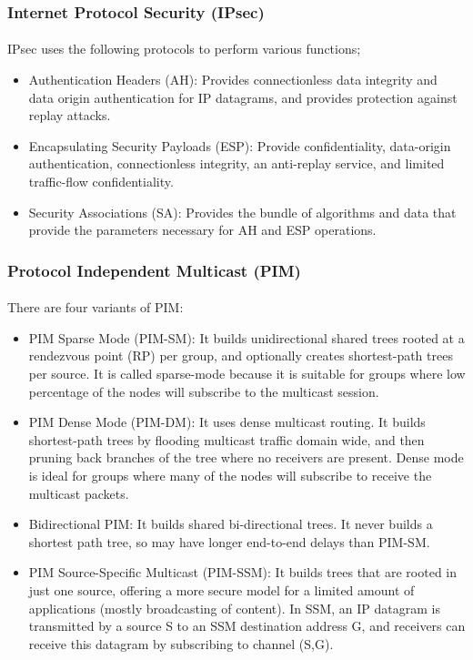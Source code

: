 \subsubsection*{Internet Protocol Security (IPsec)\cite{IPsec}}
\paragraph{}IPsec uses the following protocols to perform various functions;
\begin{itemize}
\item Authentication Headers (AH): Provides connectionless data integrity and data origin authentication for IP datagrams, and provides protection against replay attacks.
\item Encapsulating Security Payloads (ESP): Provide confidentiality, data-origin authentication, connectionless integrity, an anti-replay service, and limited traffic-flow confidentiality.
\item Security Associations (SA): Provides the bundle of algorithms and data that provide the parameters necessary for AH and ESP operations.
\end{itemize}

\subsubsection*{Protocol Independent Multicast (PIM)\cite{PIMSM}\cite{PIMDM}}

\paragraph{}There are four variants of PIM:
\begin{itemize}
\item PIM Sparse Mode (PIM-SM): It builds unidirectional shared trees rooted at a rendezvous point (RP) per group, and optionally creates shortest-path trees per source. It is called sparse-mode because it is suitable for groups where low percentage of the nodes will subscribe to the multicast session.
\item PIM Dense Mode (PIM-DM): It uses dense multicast routing. It builds shortest-path trees by flooding multicast traffic domain wide, and then pruning back branches of the tree where no receivers are present. Dense mode is ideal for groups where many of the nodes will subscribe to receive the multicast packets.
\item Bidirectional PIM: It builds shared bi-directional trees. It never builds a shortest path tree, so may have longer end-to-end delays than PIM-SM.
\item PIM Source-Specific Multicast (PIM-SSM): It builds trees that are rooted in just one source, offering a more secure model for a limited amount of applications (mostly broadcasting of content). In SSM, an IP datagram is transmitted by a source S to an SSM destination address G, and receivers can receive this datagram by subscribing to channel (S,G).
\end{itemize}

